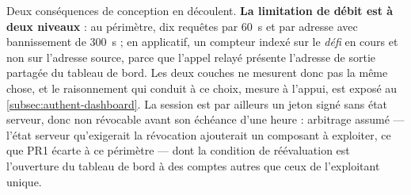 Deux conséquences de conception en découlent. \textbf{La limitation de débit est à deux niveaux} :
au périmètre, dix requêtes par 60~s et par adresse avec bannissement de 300~s ; en applicatif, un
compteur indexé sur le \emph{défi} en cours et non sur l'adresse source, parce que l'appel relayé
présente l'adresse de sortie partagée du tableau de bord. Les deux couches ne mesurent donc pas la
même chose, et le raisonnement qui conduit à ce choix, mesure à l'appui, est exposé au
\cref{subsec:authent-dashboard}. La session est par ailleurs un jeton signé sans état serveur,
donc non révocable avant son échéance d'une heure : arbitrage assumé --- l'état serveur
qu'exigerait la révocation ajouterait un composant à exploiter, ce que PR1 écarte à ce
périmètre --- dont la condition de réévaluation est l'ouverture du tableau de bord à des comptes
autres que ceux de l'exploitant unique.

